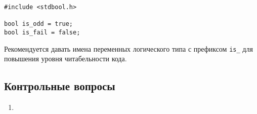 \documentclass[myc.tex]{subfiles}
\begin{document}
\begin{lstlisting}
#include <stdbool.h>

bool is_odd = true;
bool is_fail = false;
\end{lstlisting}

Рекомендуется давать имена переменных логического типа с префиксом \texttt{is\_} для повышения уровня читабельности кода.





































\vfill
\subsection*{Контрольные вопросы}
\begin{enumerate}
\item 
\end{enumerate}
\end{document}
